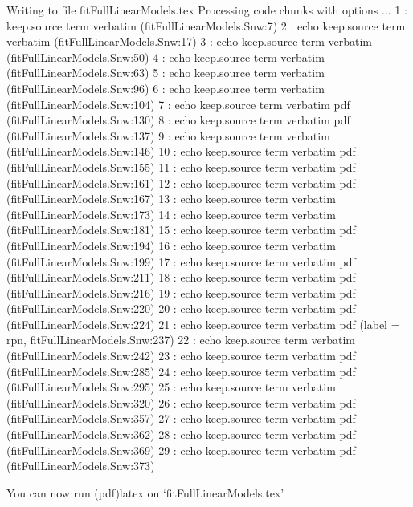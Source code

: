 \documentclass{report}
\begin{document}
\begin{Schunk}
\begin{Soutput}
Writing to file fitFullLinearModels.tex
Processing code chunks with options ...
 1 : keep.source term verbatim (fitFullLinearModels.Snw:7)
 2 : echo keep.source term verbatim (fitFullLinearModels.Snw:17)
 3 : echo keep.source term verbatim (fitFullLinearModels.Snw:50)
 4 : echo keep.source term verbatim (fitFullLinearModels.Snw:63)
 5 : echo keep.source term verbatim (fitFullLinearModels.Snw:96)
 6 : echo keep.source term verbatim (fitFullLinearModels.Snw:104)
 7 : echo keep.source term verbatim pdf  (fitFullLinearModels.Snw:130)
 8 : echo keep.source term verbatim pdf  (fitFullLinearModels.Snw:137)
 9 : echo keep.source term verbatim (fitFullLinearModels.Snw:146)
10 : echo keep.source term verbatim pdf  (fitFullLinearModels.Snw:155)
11 : echo keep.source term verbatim pdf  (fitFullLinearModels.Snw:161)
12 : echo keep.source term verbatim pdf  (fitFullLinearModels.Snw:167)
13 : echo keep.source term verbatim (fitFullLinearModels.Snw:173)
14 : echo keep.source term verbatim (fitFullLinearModels.Snw:181)
15 : echo keep.source term verbatim pdf  (fitFullLinearModels.Snw:194)
16 : echo keep.source term verbatim (fitFullLinearModels.Snw:199)
17 : echo keep.source term verbatim pdf  (fitFullLinearModels.Snw:211)
18 : echo keep.source term verbatim pdf  (fitFullLinearModels.Snw:216)
19 : echo keep.source term verbatim pdf  (fitFullLinearModels.Snw:220)
20 : echo keep.source term verbatim pdf  (fitFullLinearModels.Snw:224)
21 : echo keep.source term verbatim pdf  (label = rpn, fitFullLinearModels.Snw:237)
22 : echo keep.source term verbatim (fitFullLinearModels.Snw:242)
23 : echo keep.source term verbatim pdf  (fitFullLinearModels.Snw:285)
24 : echo keep.source term verbatim pdf  (fitFullLinearModels.Snw:295)
25 : echo keep.source term verbatim (fitFullLinearModels.Snw:320)
26 : echo keep.source term verbatim pdf  (fitFullLinearModels.Snw:357)
27 : echo keep.source term verbatim pdf  (fitFullLinearModels.Snw:362)
28 : echo keep.source term verbatim pdf  (fitFullLinearModels.Snw:369)
29 : echo keep.source term verbatim pdf  (fitFullLinearModels.Snw:373)

You can now run (pdf)latex on ‘fitFullLinearModels.tex’
\end{Soutput}
\end{Schunk}
\end{document}
